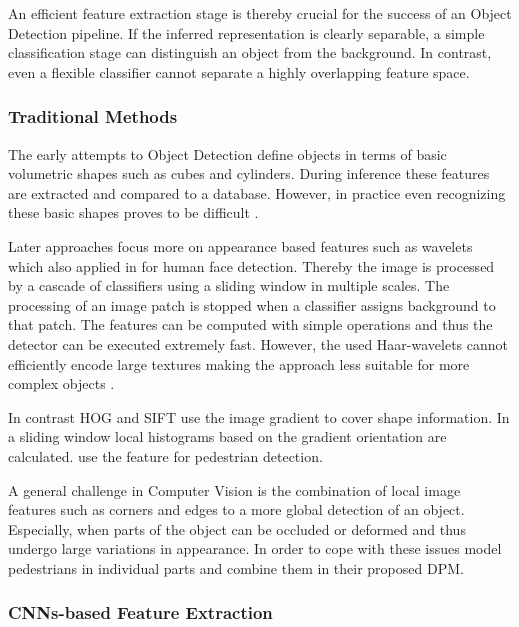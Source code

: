 An efficient feature extraction stage is thereby crucial for the success of an Object Detection pipeline. If the inferred representation is clearly separable, a simple classification stage can distinguish an object from the background. In contrast, even a flexible classifier cannot separate a highly overlapping feature space.

\subsubsection{Traditional Methods}

The early attempts to Object Detection define objects in terms of basic volumetric shapes such as cubes and cylinders. During inference these features are extracted and compared to a database. However, in practice even recognizing these basic shapes proves to be difficult \cite{Andreopoulos2013}. 

Later approaches focus more on appearance based features such as wavelets \cite{Papageorgiou} which also applied in \cite{Viola2004} for human face detection. Thereby the image is processed by a cascade of classifiers using a sliding window in multiple scales. The processing of an image patch is stopped when a classifier assigns background to that patch. The features can be computed with simple operations and thus the detector can be executed extremely fast. However, the used Haar-wavelets cannot efficiently encode large textures making the approach less suitable for more complex objects \cite{Andreopoulos2013}. 

In contrast \ac{HOG} \cite{Dalal} and \ac{SIFT} \cite{Lowe2004} use the image gradient to cover shape information. In a sliding window local histograms based on the gradient orientation are calculated. \citeauthor{Dalal} \cite{Dalal} use the feature for pedestrian detection.

A general challenge in Computer Vision is the combination of local image features such as corners and edges to a more global detection of an object. Especially, when parts of the object can be occluded or deformed and thus undergo large variations in appearance. In order to cope with these issues \citeauthor{Felzenszwalb} \cite{Felzenszwalb} model pedestrians in individual parts and combine them in their proposed \ac{DPM}.

\subsubsection{\acp{CNN}-based Feature Extraction}

